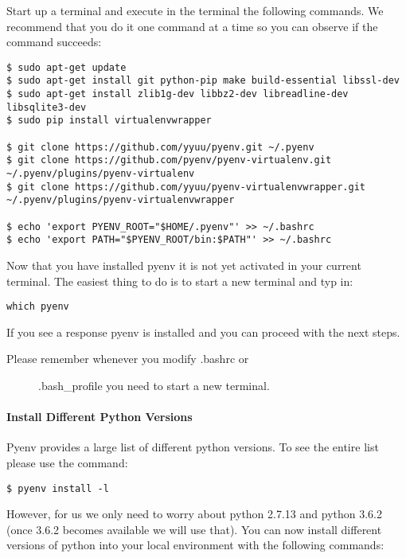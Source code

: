 Start up a terminal and execute in the terminal the following commands.
We recommend that you do it one command at a time so you can observe if
the command succeeds:

\begin{verbatim}
$ sudo apt-get update
$ sudo apt-get install git python-pip make build-essential libssl-dev
$ sudo apt-get install zlib1g-dev libbz2-dev libreadline-dev libsqlite3-dev
$ sudo pip install virtualenvwrapper

$ git clone https://github.com/yyuu/pyenv.git ~/.pyenv
$ git clone https://github.com/pyenv/pyenv-virtualenv.git ~/.pyenv/plugins/pyenv-virtualenv   
$ git clone https://github.com/yyuu/pyenv-virtualenvwrapper.git ~/.pyenv/plugins/pyenv-virtualenvwrapper

$ echo 'export PYENV_ROOT="$HOME/.pyenv"' >> ~/.bashrc
$ echo 'export PATH="$PYENV_ROOT/bin:$PATH"' >> ~/.bashrc
\end{verbatim}

Now that you have installed pyenv it is not yet activated in your
current terminal. The easiest thing to do is to start a new terminal and
typ in:

\begin{verbatim}
which pyenv
\end{verbatim}

If you see a response pyenv is installed and you can proceed with the
next steps.

\begin{description}
\item[Please remember whenever you modify .bashrc or]
.bash\_profile you need to start a new terminal.
\end{description}

\paragraph{Install Different Python
Versions}\label{install-different-python-versions}

Pyenv provides a large list of different python versions. To see the
entire list please use the command:

\begin{verbatim}
$ pyenv install -l
\end{verbatim}

However, for us we only need to worry about python 2.7.13 and python
3.6.2 (once 3.6.2 becomes available we will use that). You can now
install different versions of python into your local environment with
the following commands:

